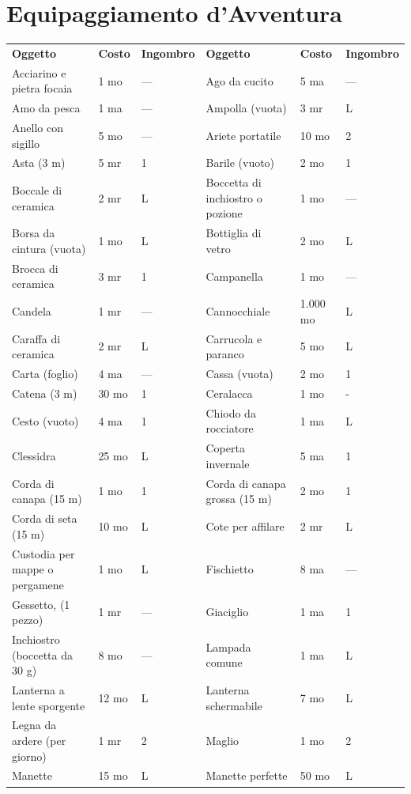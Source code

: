 \documentclass[a4paper,11pt,twoside,openany]{book}
\begin{document}
{\section{Equipaggiamento d'Avventura}\label{Equipaggiamento}

\label{equipaggiamento-davventura}


\begin{longtable}{|L{4cm} |k{1.5cm} |k{1.5cm}|L{5cm} |k{1.5cm} |k{1.5cm}|}
\tabcolsep=0.11cm
\textbf{Oggetto}&	\textbf{Costo}	& \textbf{Ingombro}&\textbf{Oggetto}&	\textbf{Costo}	&\textbf{Ingombro}\\
Acciarino e pietra focaia	&1 mo&	— & 	Ago da cucito&	5 ma&	—\\
Amo da pesca&	1 ma&	—&	Ampolla (vuota)&	3 mr&	L\\
Anello con sigillo&	5 mo&	—&	Ariete portatile&	10 mo	&2\\
Asta (3 m)&	5 mr&	1&	Barile (vuoto)&	2 mo&	1\\
Boccale di ceramica	&2 mr&	L &	Boccetta di inchiostro o pozione&	1 mo&	—\\
Borsa da cintura (vuota)&	1 mo&	L&	Bottiglia di vetro&	2 mo& L\\
Brocca di ceramica&	3 mr&	1&	Campanella&	1 mo&	—\\
Candela&	1 mr&	—&	Cannocchiale&	1.000 mo&	L\\
Caraffa di ceramica&	2 mr&	L&	Carrucola e paranco&	5 mo&	L\\
Carta (foglio)&	4 ma&	—&	Cassa (vuota)&	2 mo& 1\\
Catena (3 m)&	30 mo&	1&	Ceralacca&	1 mo&	- \\
Cesto (vuoto)&	4 ma&	1&	Chiodo da rocciatore&	1 ma& L\\
Clessidra&	25 mo	&L&	Coperta invernale&	5 ma&1\\
Corda di canapa (15 m)	&1 mo&	1&	Corda di canapa grossa (15 m)&2 mo&1\\
Corda di seta (15 m)&10 mo&L&	Cote per affilare&2 mr&L\\
Custodia per mappe o pergamene&1 mo&L&	Fischietto&8 ma&—\\
Gessetto, (1 pezzo)&1 mr&—&	Giaciglio&1 ma&1\\
Inchiostro (boccetta da 30 g)&8 mo&—&	Lampada comune&1 ma&L\\
Lanterna a lente sporgente&12 mo&L&	Lanterna schermabile&7 mo&L\\
Legna da ardere (per giorno)&1 mr&2&	Maglio&1 mo&2\\
Manette&15 mo&L&	Manette perfette&50 mo&L\\

\end{longtable}}
\end{document}
